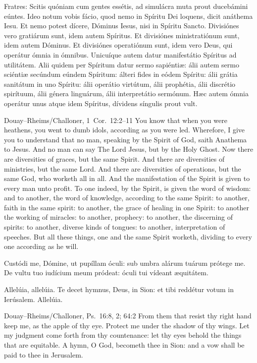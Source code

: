 Fratres: Scitis quóniam cum gentes essétis, ad simulácra muta prout ducebámini
eúntes. Ideo notum vobis fácio, quod nemo in Spíritu Dei loquens, dicit
anáthema Iesu. Et nemo potest dícere, Dóminus Iesus, nisi in Spíritu Sancto.
Divisiónes vero gratiárum sunt, idem autem Spíritus. Et divisiónes
ministratiónum sunt, idem autem Dóminus. Et divisiónes operatiónum sunt, idem
vero Deus, qui operátur ómnia in ómnibus. Unicuíque autem datur manifestátio
Spíritus ad utilitátem. Alii quidem per Spíritum datur sermo sapiéntiæ: álii
autem sermo sciéntiæ secúndum eúndem Spíritum: álteri fides in eódem Spíritu:
álii grátia sanitátum in uno Spíritu: álii operátio virtútum, álii prophétia,
álii discrétio spirítuum, álii génera linguárum, álii interpretátio sermónum.
Hæc autem ómnia operátur unus atque idem Spíritus, dívidens síngulis prout
vult.
\finishfulltextelement
\begin{fulltextenglish}{Douay--Rheims/Challoner, 1~Cor.~12:2--11}
You know that when you were heathens, you went to dumb idols, according as you
were led. Wherefore, I give you to understand that no man, speaking by the
Spirit of God, saith Anathema to Jesus. And no man can say The Lord Jesus, but
by the Holy Ghost. Now there are diversities of graces, but the same Spirit.
And there are diversities of ministries, but the same Lord. And there are
diversities of operations, but the same God, who worketh all in all. And the
manifestation of the Spirit is given to every man unto profit. To one indeed,
by the Spirit, is given the word of wisdom: and to another, the word of
knowledge, according to the same Spirit: to another, faith in the same spirit:
to another, the grace of healing in one Spirit: to another the working of
miracles: to another, prophecy: to another, the discerning of spirits: to
another, diverse kinds of tongues: to another, interpretation of speeches. But
all these things, one and the same Spirit worketh, dividing to every one
according as he will.
\end{fulltextenglish}

Custódi me, Dómine, ut pupíllam óculi: sub umbra alárum tuárum prótege me.
\medskip\noindent{} De vultu tuo iudícium meum pródeat: óculi tui
vídeant æquitátem.

\medskip\noindent Allelúia, allelúia.  Te decet hymnus, Deus, in
Sion: et tibi reddétur votum in Ierúsalem. Allelúia.
\finishfulltextelement
\begin{fulltextenglish}{Douay--Rheims/Challoner, Ps.~16:8, 2; 64:2}
From them that resist thy right hand keep me, as the apple of thy eye. Protect
me under the shadow of thy wings. Let my judgment come forth from thy
countenance: let thy eyes behold the things that are equitable. A hymn, O God,
becometh thee in Sion: and a vow shall be paid to thee in Jerusalem.
\end{fulltextenglish}

